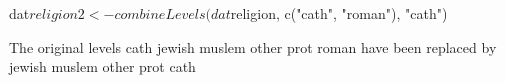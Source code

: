 \begin{Schunk}
\begin{Sinput}
 dat$religion2 <- combineLevels(dat$religion, c("cath", "roman"), "cath")
\end{Sinput}
\begin{Soutput}
The original levels cath jewish muslem other prot roman 
have been replaced by jewish muslem other prot cath 
\end{Soutput}
\end{Schunk}
